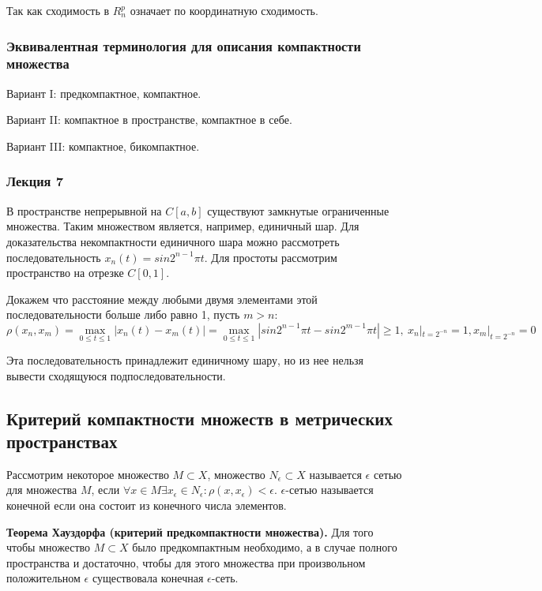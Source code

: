 \documentclass[14pt]{extarticle}
\theoremstyle{definition}
\theoremstyle{remark}
\renewcommand{\[}{\begin{dmath*}[compact]}
\renewcommand{\]}{\end{dmath*}}
\newcommand{\sep}{ , \ \allowbreak }
\newcommand{\tth}[1][]{\textbf{Теорема#1.}}
\begin{document}
Так как сходимость в $R_n^p$ означает по координатную сходимость.

\subsubsection{Эквивалентная терминология для описания компактности множества}

Вариант I: предкомпактное, компактное.

Вариант II: компактное в пространстве, компактное в себе.

Вариант III: компактное, бикомпактное.

\subsubsection{Лекция 7}

В пространстве непрерывной на $C[a,b]$ существуют замкнутые ограниченные множества. Таким множеством является, например, единичный шар. Для доказательства некомпактности единичного шара можно рассмотреть последовательность $x_n(t)=sin2^{n-1}\pi t$. Для простоты рассмотрим пространство на отрезке $C[0,1]$.

Докажем что расстояние между любыми двумя элементами этой последовательности больше либо равно 1, пусть $m>n$:
\[ {\rho(x_n,x_m)} = {\max_{0\leq t \leq 1} |x_n(t)-x_m(t)|} = \max_{0\leq t \leq 1} |sin 2^{n-1}\pi t-\allowbreak sin 2^{m-1}\pi t|\geq 1 \sep x_n|_{t=2^{-n}}=1, x_m|_{t=2^{-n}}=0 \]

Эта последовательность принадлежит единичному шару, но из нее нельзя вывести сходящуюся подпоследовательности.

\subsection{Критерий компактности множеств в метрических пространствах}

Рассмотрим некоторое множество $M\subset X$, множество $N_{\epsilon} \subset X$ называется $\epsilon$ сетью для множества $M$, если $\forall x \in M \exists x_{\epsilon} \in N_{\epsilon}: \rho(x,x_{\epsilon})<\epsilon$. $\epsilon$-сетью называется конечной если она состоит из конечного числа элементов.

\tth[ Хауздорфа (критерий предкомпактности множества)] Для того чтобы множество $M\subset X$ было предкомпактным необходимо, а в случае полного пространства и достаточно, чтобы для этого множества при произвольном положительном $\epsilon$ существовала конечная $\epsilon$-сеть.
\end{document}
